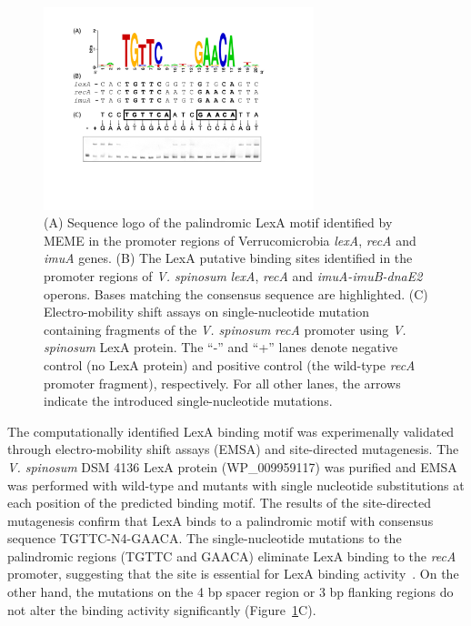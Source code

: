 \begin{figure}
  \centering
  \includegraphics[width=0.7\textwidth]{figures/chapter5/verruco_lexa}
  \caption{(A) Sequence logo of the palindromic LexA motif identified by MEME
    in the promoter regions of Verrucomicrobia \textit{lexA}, \textit{recA} and
    \textit{imuA} genes. (B) The LexA putative binding sites identified in the
    promoter regions of \textit{V. spinosum} \textit{lexA}, \textit{recA} and
    \textit{imuA-imuB-dnaE2} operons. Bases matching the consensus sequence are
    highlighted. (C) Electro-mobility shift assays on single-nucleotide
    mutation containing fragments of the \textit{V. spinosum} \textit{recA}
    promoter using \textit{V. spinosum} LexA protein. The ``-'' and ``+'' lanes
    denote negative control (no LexA protein) and positive control (the
    wild-type \textit{recA} promoter fragment), respectively. For all other
    lanes, the arrows indicate the introduced single-nucleotide mutations.}
  \label{fig:verruco-lexa}
\end{figure}

The computationally identified LexA binding motif was experimenally validated
through electro-mobility shift assays (EMSA) and site-directed mutagenesis.
The \textit{V. spinosum} DSM 4136
LexA protein (WP\_009959117) was purified and EMSA was performed with wild-type
and mutants with single nucleotide substitutions at each position of the
predicted binding motif. The results of the site-directed mutagenesis confirm
that LexA binds to a palindromic motif with consensus sequence
TGTTC-N4-GAACA\@. The single-nucleotide mutations to the palindromic regions
(TGTTC and GAACA) eliminate LexA binding to the \textit{recA} promoter,
suggesting that the site is essential for LexA binding
activity~\citep{groban2005binding}. On the other hand, the mutations on the 4 bp
spacer region or 3 bp flanking regions do not alter the binding activity
significantly (Figure~\ref{fig:verruco-lexa}C).

